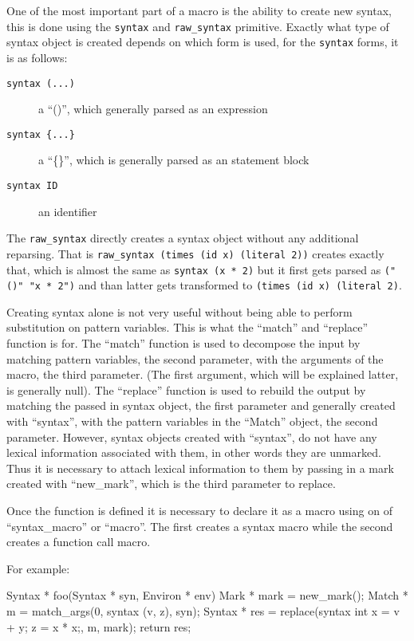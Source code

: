 \documentclass[12pt,english,letterpaper]{article}
\begin{document}
One of the most important part of a macro is the ability to create new
syntax, this is done using the \verb/syntax/ and \verb/raw_syntax/
primitive.  Exactly what type of syntax object is created depends on
which form is used, for the \verb/syntax/ forms, it is as follows:
\begin{description}
\item[\texttt{syntax (...)}] a ``()'', which generally parsed as an expression
\item[\texttt{syntax \{...\}}] a ``\{\}'', which is generally parsed as an statement block
\item[\texttt{syntax ID}] an identifier
\end{description}
The \verb/raw_syntax/ directly creates a syntax object without any
additional reparsing.  That is
\verb/raw_syntax (times (id x) (literal 2))/ creates exactly that,
which is almost the same as \verb/syntax (x * 2)/ but it first gets
parsed as \verb/("()" "x * 2")/ and than latter gets transformed to
\verb/(times (id x) (literal 2)/.

Creating syntax alone is not very useful without being able to perform
substitution on pattern variables.  This is what the ``match'' and
``replace'' function is for.  The ``match'' function is used to
decompose the input by matching pattern variables, the second
parameter, with the arguments of the macro, the third
parameter.  (The first argument, which will be explained latter, is
generally null).  The ``replace'' function is used to rebuild the
output by matching the passed in syntax object, the first parameter
and generally created with ``syntax'', with the pattern variables
in the ``Match'' object, the second parameter.  However, syntax
objects created with ``syntax'', do not have any lexical information
associated with them, in other words they are unmarked.  Thus it is
necessary to attach lexical information to them by passing in a mark
created with ``new\_mark'', which is the third parameter to replace.

Once the function is defined it is necessary to declare it as a macro
using on of ``syntax\_macro'' or ``macro''.  The first creates a
syntax macro while the second creates a function call macro.

For example:
\begin{code}
Syntax * foo(Syntax * syn, Environ * env) {
  Mark * mark = new_mark();
  Match * m = match_args(0, syntax (v, z), syn);
  Syntax * res = replace(syntax {int x = v + y; z = x * x;}, m, mark);
  return res;
}
\end{code}
\end{document}
